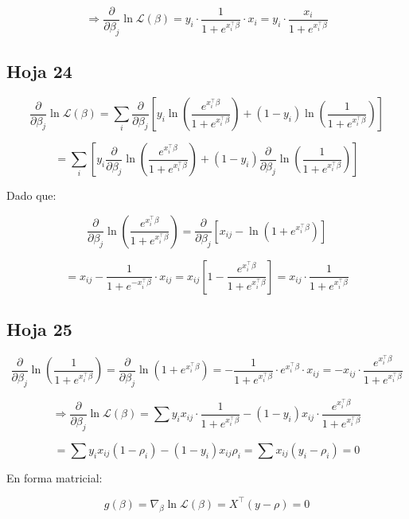 \documentclass[12pt]{article}
\begin{document}
\[
\Rightarrow \frac{\partial}{\partial \beta_j} \ln \mathcal{L}(\beta)
= y_i \cdot \frac{1}{1 + e^{x_i^\top \beta}} \cdot x_i
= y_i \cdot \frac{x_i}{1 + e^{x_i^\top \beta}}
\]

\subsection{Hoja 24}
\[
\frac{\partial}{\partial \beta_j} \ln \mathcal{L}(\beta)
= \sum_i \frac{\partial}{\partial \beta_j} \left[
y_i \ln \left( \frac{e^{x_i^\top \beta}}{1 + e^{x_i^\top \beta}} \right)
+ (1 - y_i) \ln \left( \frac{1}{1 + e^{x_i^\top \beta}} \right)
\right]
\]

\[
= \sum_i \left[
y_i \frac{\partial}{\partial \beta_j} \ln \left( \frac{e^{x_i^\top \beta}}{1 + e^{x_i^\top \beta}} \right)
+ (1 - y_i) \frac{\partial}{\partial \beta_j} \ln \left( \frac{1}{1 + e^{x_i^\top \beta}} \right)
\right]
\]

Dado que:

\[
\frac{\partial}{\partial \beta_j} \ln \left( \frac{e^{x_i^\top \beta}}{1 + e^{x_i^\top \beta}} \right)
= \frac{\partial}{\partial \beta_j} \left[ x_{ij} - \ln \left( 1 + e^{x_i^\top \beta} \right) \right]
\]

\[
= x_{ij} - \frac{1}{1 + e^{-x_i^\top \beta}} \cdot x_{ij}
= x_{ij} \left[ 1 - \frac{e^{x_i^\top \beta}}{1 + e^{x_i^\top \beta}} \right]
= x_{ij} \cdot \frac{1}{1 + e^{x_i^\top \beta}}
\]

\subsection{Hoja 25}
\[
\frac{\partial}{\partial \beta_j} \ln \left( \frac{1}{1 + e^{x_i^\top \beta}} \right) 
= \frac{\partial}{\partial \beta_j} \ln \left(1 + e^{x_i^\top \beta} \right)
= - \frac{1}{1 + e^{x_i^\top \beta}} \cdot e^{x_i^\top \beta} \cdot x_{ij}
= -x_{ij} \cdot \frac{e^{x_i^\top \beta}}{1 + e^{x_i^\top \beta}}
\]

\medskip

\[
\Rightarrow \frac{\partial}{\partial \beta_j} \ln \mathcal{L}(\beta) =
\sum y_i x_{ij} \cdot \frac{1}{1 + e^{x_i^\top \beta}} 
- (1 - y_i) x_{ij} \cdot \frac{e^{x_i^\top \beta}}{1 + e^{x_i^\top \beta}}
\]

\[
= \sum y_i x_{ij} (1 - \rho_i) - (1 - y_i) x_{ij} \rho_i
= \sum x_{ij} (y_i - \rho_i) = 0
\]

\medskip

En forma matricial:

\[
g(\beta) = \nabla_\beta \ln \mathcal{L}(\beta) = X^\top (y - \rho) = 0
\]
\end{document}
